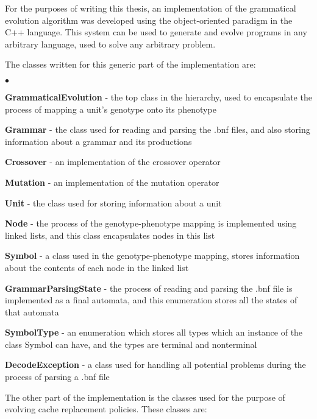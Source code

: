 For the purposes of writing this thesis, an implementation of the grammatical evolution algorithm was developed using the object-oriented paradigm in the C++ language. This system can be used to generate and evolve programs in any arbitrary language, used to solve any arbitrary problem.

The classes written for this generic part of the implementation are:

\begin{list}{$\bullet$}{}  	
	\item \textbf{GrammaticalEvolution} - the top class in the hierarchy, used to encapsulate the process of mapping a unit's genotype onto its phenotype
	\item \textbf{Grammar} - the class used for reading and parsing the .bnf files, and also storing information about a grammar and its productions 
	\item \textbf{Crossover} - an implementation of the crossover operator
	\item \textbf{Mutation} - an implementation of the mutation operator
	\item \textbf{Unit} - the class used for storing information about a unit
	\item \textbf{Node} - the process of the genotype-phenotype mapping is implemented using linked lists, and this class encapsulates nodes in this list
	\item \textbf{Symbol} - a class used in the genotype-phenotype mapping, stores information about the contents of each node in the linked list
	\item \textbf{GrammarParsingState} - the process of reading and parsing the .bnf file is implemented as a final automata, and this enumeration stores all the states of that automata
	\item \textbf{SymbolType} - an enumeration which stores all types which an instance of the class Symbol can have, and the types are terminal and nonterminal
	\item \textbf{DecodeException} - a class used for handling all potential problems during the process of parsing a .bnf file
\end{list}

The other part of the implementation is the classes used for the purpose of evolving cache replacement policies. These classes are:

